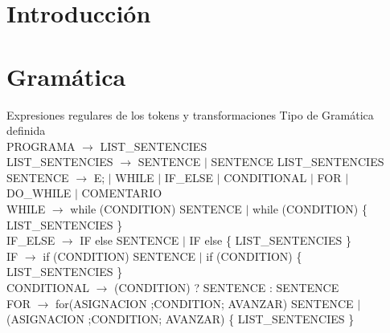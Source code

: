 \documentclass[10pt,a4paper]{article}
\begin{document}

\fecha{\today}



\maketitle

\tableofcontents

\newpage
\section{Introducción}

\section{Gramática}
Expresiones regulares de los tokens y transformaciones
Tipo de Gramática definida \\


PROGRAMA $\rightarrow$ LIST\_SENTENCIES \\

LIST\_SENTENCIES $\rightarrow$ SENTENCE $|$ SENTENCE LIST\_SENTENCIES\\

SENTENCE $\rightarrow$ E; $|$ WHILE $|$ IF\_ELSE $|$ CONDITIONAL $|$ FOR $|$ DO\_WHILE $|$ COMENTARIO \\

WHILE $\rightarrow$ while (CONDITION) SENTENCE $|$ while (CONDITION) \{ LIST\_SENTENCIES \} \\

IF\_ELSE $\rightarrow$ IF else SENTENCE $|$ IF else \{ LIST\_SENTENCIES \} \\

IF $\rightarrow$ if (CONDITION) SENTENCE $|$ if (CONDITION) \{ LIST\_SENTENCIES \} \\

CONDITIONAL $\rightarrow$ (CONDITION) ? SENTENCE : SENTENCE \\

FOR $\rightarrow$ for(ASIGNACION ;CONDITION; AVANZAR) SENTENCE $|$ (ASIGNACION ;CONDITION; AVANZAR) \{ LIST\_SENTENCIES \} \\
\end{document}
